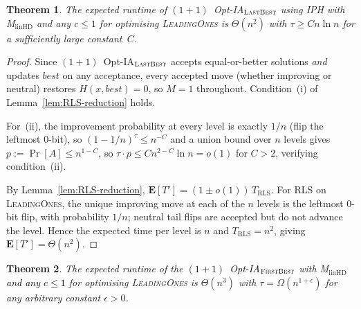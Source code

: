\documentclass[lettersize,journal]{IEEEtran}
\newcommand{\new}[1]{\textcolor{black}{#1}}
\newcommand{\rerev}[1]{\textcolor{black}{#1}}
\newcommand{\linHD}{M$_{\text{linHD}}$}
\newcommand{\IPHfcm}{IPH}
\newcommand{\lastBest}{$(1+1)$~Opt-IA$_{\textsc{LastBest}}$}
\newtheorem{theorem}{Theorem}
\begin{document}
\begin{theorem}\label{thm:LBleadingones}
The expected runtime of \lastBest{} using \IPHfcm{} with \linHD{} and any
$c\leq 1$ for optimising \textsc{LeadingOnes} is $\Theta(n^2)$ with
$\tau\geq Cn\ln n$ for a sufficiently large constant~$C$.
\end{theorem}
\begin{proof}
Since \lastBest{} accepts equal-or-better solutions \emph{and} updates
$\mathit{best}$ on any acceptance, every accepted move (whether improving or
neutral) restores $H(x,\mathit{best})=0$, so $M=1$ throughout.
Condition~(i) of Lemma~\ref{lem:RLS-reduction} holds.

For~(ii), the improvement probability at every level is exactly $1/n$
(flip the leftmost $0$-bit), so $(1-1/n)^\tau\leq n^{-C}$
and a union bound over $n$ levels gives $p:=\Pr[A]\leq n^{1-C}$\rerev{, so}
$\tau\cdot p\leq Cn^{2-C}\ln n=o(1)$ for $C>2$, verifying
condition~(ii).

By Lemma~\ref{lem:RLS-reduction},
$\mathbf{E}[T']=(1\pm o(1))\,T_{\mathrm{RLS}}$.
For RLS on \textsc{LeadingOnes}, the unique improving move at each of the $n$
levels is the leftmost $0$-bit flip, with probability $1/n$; neutral tail
flips are accepted but do not advance the level.  Hence the expected time per
level is $n$ and $T_{\mathrm{RLS}}=n^2$, giving $\mathbf{E}[T']=\Theta(n^2)$.
\end{proof}

\begin{theorem}\label{thm:FBleadingones}
The expected runtime of the \new{$(1+1)$~Opt-IA$_{\textsc{FirstBest}}$}  with {\linHD } \new{and any $c\leq 1$} for optimising
\textsc{LeadingOnes} is $\Theta(n^3)$ with $\tau=\Omega(n^{1+\epsilon})$ for any arbitrary
constant $\epsilon>0$.
\end{theorem}
\end{document}
